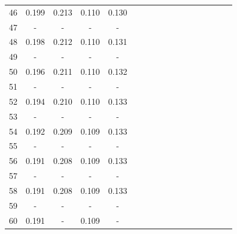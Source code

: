 \documentclass{report}
\begin{document}
\begin{appendices}
\begin{table}
\begin{tabular}{|c|cccc|cccc|cccc|cccc|}
46 & 0.199 & 0.213 & 0.110 & 0.130 & & & & & & & & & & & &\\
47 &   -   &   -   &   -   &   -   & & & & & & & & & & & &\\
48 & 0.198 & 0.212 & 0.110 & 0.131 & & & & & & & & & & & &\\
49 &   -   &   -   &   -   &   -   & & & & & & & & & & & &\\
50 & 0.196 & 0.211 & 0.110 & 0.132 & & & & & & & & & & & &\\
51 &   -   &   -   &   -   &   -   & & & & & & & & & & & &\\
52 & 0.194 & 0.210 & 0.110 & 0.133 & & & & & & & & & & & &\\
53 &   -   &   -   &   -   &   -   & & & & & & & & & & & &\\
54 & 0.192 & 0.209 & 0.109 & 0.133 & & & & & & & & & & & &\\
55 &   -   &   -   &   -   &   -   & & & & & & & & & & & &\\
56 & 0.191 & 0.208 & 0.109 & 0.133 & & & & & & & & & & & &\\
57 &   -   &   -   &   -   &   -   & & & & & & & & & & & &\\
58 & 0.191 & 0.208 & 0.109 & 0.133 & & & & & & & & & & & &\\
59 &   -   &   -   &   -   &   -   & & & & & & & & & & & &\\
60 & 0.191 &   -   & 0.109 &   -   & & & & & & & & & & & &\\
\hline
\end{tabular}
\end{table}


\end{appendices}
\end{document}
